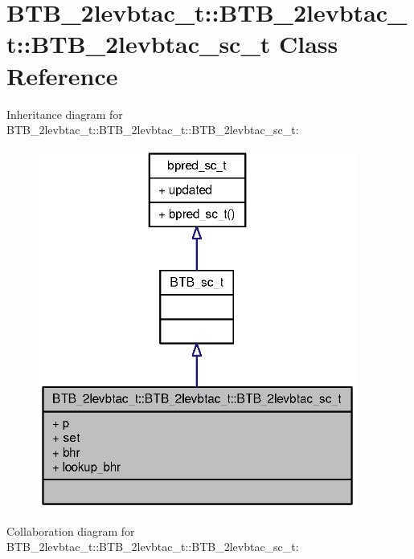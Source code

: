 \section{BTB\_\-2levbtac\_\-t::BTB\_\-2levbtac\_\-t::BTB\_\-2levbtac\_\-sc\_\-t Class Reference}
\label{classBTB__2levbtac__t_1_1BTB__2levbtac__sc__t}
Inheritance diagram for BTB\_\-2levbtac\_\-t::BTB\_\-2levbtac\_\-t::BTB\_\-2levbtac\_\-sc\_\-t:\nopagebreak
\begin{figure}[H]
\begin{center}
\leavevmode
\includegraphics[width=296pt]{classBTB__2levbtac__t_1_1BTB__2levbtac__sc__t__inherit__graph}
\end{center}
\end{figure}
Collaboration diagram for BTB\_\-2levbtac\_\-t::BTB\_\-2levbtac\_\-t::BTB\_\-2levbtac\_\-sc\_\-t:\nopagebreak
